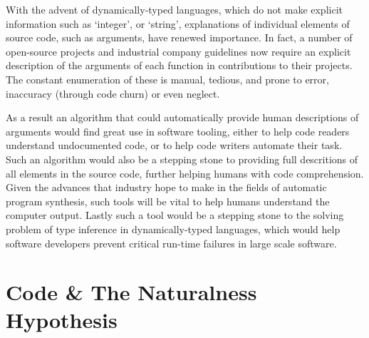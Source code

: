 With the advent of dynamically-typed languages, which do not make explicit information such as `integer', or `string', explanations of individual elements of source code, such as arguments, have renewed importance.
In fact, a number of open-source projects \cite{noauthor_numpydoc_nodate} and industrial company guidelines \cite{noauthor_style_2018} now require an explicit description of the arguments of each function in contributions to their projects.
The constant enumeration of these is manual, tedious, and prone to error, inaccuracy (through code churn) or even neglect.

As a result an algorithm that could automatically provide human descriptions of arguments would find great use in software tooling, either to help code readers understand undocumented code, or to help code writers automate their task.
Such an algorithm would also be a stepping stone to providing full descritions of all elements in the source code, further helping humans with code comprehension.
Given the advances that industry hope to make in the fields of automatic program synthesis, such tools will be vital to help humans understand
the computer output.
Lastly such a tool would be a stepping stone to the solving problem of type inference in dynamically-typed languages, which would help software developers prevent critical run-time failures in large scale software.



\section{Code \& The Naturalness Hypothesis} %
\label{sec:code_and_natural_language}



